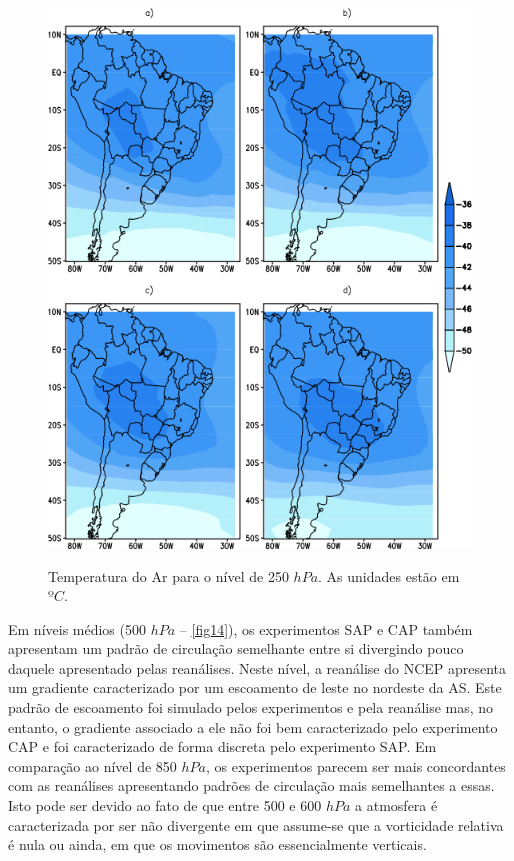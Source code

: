 \begin{figure}[!hbp]
\centering
\includegraphics[height=15cm]{./figs/media_temp_anl_250hPa.png}
\caption{Temperatura do Ar para o nível de 250 $hPa$. As unidades estão em $ºC$.}
\label{fig13}
\end{figure}

Em níveis médios (500 $hPa$ – \autoref{fig14}), os experimentos SAP e CAP também apresentam um padrão de circulação semelhante entre si divergindo pouco daquele apresentado pelas reanálises. Neste nível, a reanálise do NCEP apresenta um gradiente caracterizado por um escoamento de leste no nordeste da AS. Este padrão de escoamento foi simulado pelos experimentos e pela reanálise mas, no entanto, o gradiente associado a ele não foi bem caracterizado pelo experimento CAP e foi caracterizado de forma discreta pelo experimento SAP. Em comparação ao nível de 850 $hPa$, os experimentos parecem ser mais concordantes com as reanálises apresentando padrões de circulação mais semelhantes a essas. Isto pode ser devido ao fato de que entre 500 e 600 $hPa$ a atmosfera é caracterizada por ser não divergente em que assume-se que a vorticidade relativa é nula ou ainda, em que os movimentos são essencialmente verticais.

